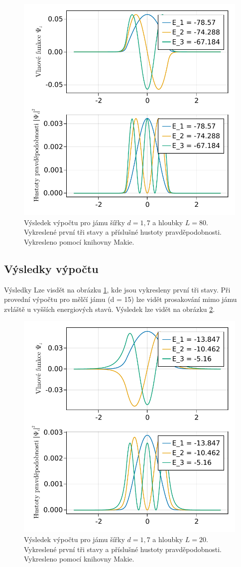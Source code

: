 \documentclass[12pt, a4paper]{article}
\begin{document}
\begin{figure}
    \centering
    \includegraphics{figure.pdf}
    \caption{Výsledek výpočtu pro jámu šířky $d = 1,7$ a hloubky $L =80$. Vykreslené první tři stavy a příslušné hustoty pravděpodobnosti. Vykresleno pomocí knihovny Makie.}
    \label{fig:vysledek}
\end{figure}


\subsection*{Výsledky výpočtu}
Výsledky Lze visdět na obrázku \ref{fig:vysledek}, kde jsou vykresleny první tři stavy. Při provední výpočtu pro mělčí jámu (d = 15) lze vidět prosakování mimo jámu zvláště u vyšších energiových stavů. Výsledek lze vidět na obrázku \ref{fig:vysledek_1}.

\begin{figure}
    \centering
    \includegraphics{figure_1.pdf}
    \caption{Výsledek výpočtu pro jámu šířky $d = 1,7$ a hloubky $L =20$. Vykreslené první tři stavy a příslušné hustoty pravděpodobnosti. Vykresleno pomocí knihovny Makie.}
    \label{fig:vysledek_1}
\end{figure}
\end{document}
